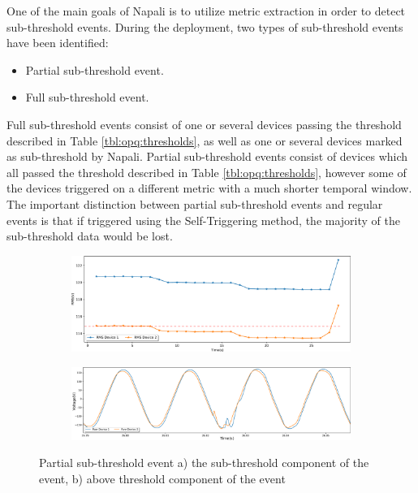 One of the main goals of Napali is to utilize metric extraction in order to detect sub-threshold events.
During the deployment, two types of sub-threshold events have been identified:
\begin{itemize}
    \item Partial sub-threshold event.
    \item Full sub-threshold event.
\end{itemize}
Full sub-threshold events consist of one or several devices passing the threshold described in Table \ref{tbl:opq:thresholds},
as well as one or several devices marked as sub-threshold by Napali.
Partial sub-threshold events consist of devices which all passed the threshold described in Table \ref{tbl:opq:thresholds}, however some of the devices triggered on a different metric with a much shorter temporal window.
The important distinction between partial sub-threshold events and regular events is that if triggered using the Self-Triggering method, the majority of the sub-threshold data would be lost.

\begin{figure}[h]
    \centering
    \begin{subfigure}{1\textwidth}
        \centering
        \includegraphics[width=1\linewidth]{img/napali_eval/rms_gridwide_subthreshold.pdf}
        \caption{}
        \label{fig:expdes:8:1}
    \end{subfigure}%

    \begin{subfigure}{1\textwidth}
        \centering
        \includegraphics[width=1\linewidth]{img/napali_eval/raw_gridwide_subthreshold_zoom.pdf}
        \caption{}
        \label{fig:expdes:8:2}
    \end{subfigure}
    \caption{Partial sub-threshold event a) the sub-threshold component of the event, b) above threshold component of the event}
    \label{fig:expdes:8}
\end{figure}

